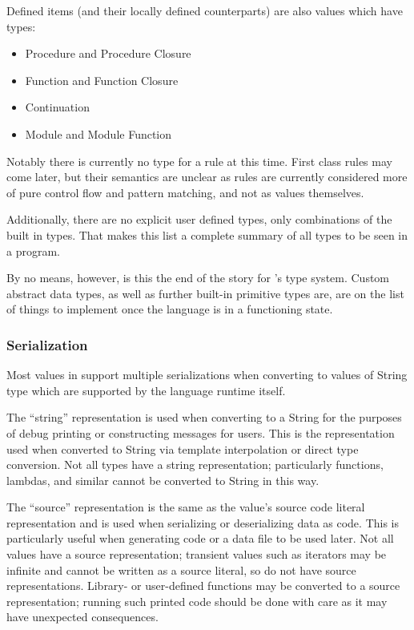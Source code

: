\noindent
Defined items (and their locally defined counterparts) are also values which
have types:

\begin{itemize}
    \item Procedure and Procedure Closure
    \item Function and Function Closure
    \item Continuation
    \item Module and Module Function
\end{itemize}

\noindent
Notably there is currently no type for a rule at this time. First class rules
may come later, but their semantics are unclear as rules are currently considered
more of pure control flow and pattern matching, and not as values themselves.

Additionally, there are no explicit user defined types, only combinations of the
built in types. That makes this list a complete summary of all types to be seen
in a \Trilogy{} program.

By no means, however, is this the end of the story for \Trilogy{}'s type
system. Custom abstract data types, as well as further built-in primitive types
are, are on the list of things to implement once the language is in a functioning
state.

\subsubsection{Serialization}

Most values in \Trilogy{} support multiple serializations when converting
to values of String type which are supported by the language runtime itself.

The ``string'' representation is used when converting to a String for
the purposes of debug printing or constructing messages for users.
This is the representation used when converted to String via template
interpolation or direct type conversion. Not all types have a string
representation; particularly functions, lambdas, and similar cannot
be converted to String in this way.

The ``source'' representation is the same as the value's source code literal
representation and is used when serializing or deserializing data as code.
This is particularly useful when generating code or a data file to be used
later. Not all values have a source representation; transient values such
as iterators may be infinite and cannot be written as a source literal, so
do not have source representations. Library- or user-defined functions may
be converted to a source representation; running such printed code should
be done with care as it may have unexpected consequences.

